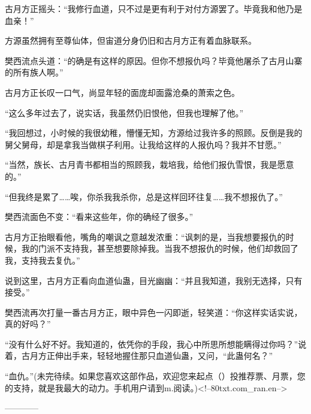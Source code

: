 \begin{this_body}
古月方正摇头：“我修行血道，只不过是更有利于对付方源罢了。毕竟我和他乃是血亲！”

方源虽然拥有至尊仙体，但宙道分身仍旧和古月方正有着血脉联系。

樊西流点头道：“的确是有这样的原因。但你不想报仇吗？毕竟他屠杀了古月山寨的所有族人啊。”

古月方正长叹一口气，尚显年轻的面庞却面露沧桑的萧索之色。

“这么多年过去了，说实话，我虽然仍旧恨他，但我也理解了他。”

“我回想过，小时候的我很幼稚，懵懂无知，方源给过我许多的照顾。反倒是我的舅父舅母，却是拿我当做棋子利用。让我给这样的人报仇吗？我并不甘愿。”

“当然，族长、古月青书都相当的照顾我，栽培我，给他们报仇雪恨，我是愿意的。”

“但我终是累了……唉，你杀我我杀你，总是这样回环往复……我不想报仇了。”

樊西流面色不变：“看来这些年，你的确经了很多。”

古月方正抬眼看他，嘴角的嘲讽之意越发浓重：“讽刺的是，当我想要报仇的时候，我的门派不支持我，甚至想要除掉我。当我不想报仇的时候，他们却救回了我，支持我去复仇。”

说到这里，古月方正看向血道仙蛊，目光幽幽：“并且我知道，我别无选择，只有接受。”

樊西流再次打量一番古月方正，眼中异色一闪即逝，轻笑道：“你这样实话实说，真的好吗？”

“没有什么好不好。我知道的，依凭你的手段，我心中所思所想能瞒得过你吗？”说着，古月方正伸出手来，轻轻地握住那只血道仙蛊，又问，“此蛊何名？”

“血仇。”(未完待续。如果您喜欢这部作品，欢迎您来起点（）投推荐票、月票，您的支持，就是我最大的动力。手机用户请到m.阅读。)<!--80txt.com\_ran.en-->

------------

\end{this_body}

